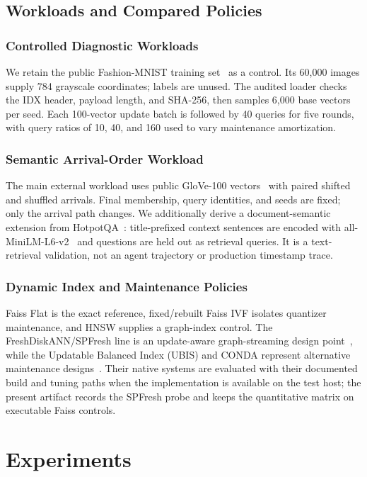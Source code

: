 \subsection{Workloads and Compared Policies}
\subsubsection{Controlled Diagnostic Workloads}
We retain the public Fashion-MNIST training set~\cite{fashion} as a control. Its 60,000
images supply 784 grayscale coordinates; labels are unused. The audited loader checks
the IDX header, payload length, and SHA-256, then samples 6,000 base vectors per seed.
Each 100-vector update batch is followed by 40 queries for five rounds, with query
ratios of 10, 40, and 160 used to vary maintenance amortization.

\subsubsection{Semantic Arrival-Order Workload}
The main external workload uses public GloVe-100 vectors~\cite{glove} with paired
shifted and shuffled arrivals. Final membership, query identities, and seeds are fixed;
only the arrival path changes. We additionally derive a document-semantic extension
from HotpotQA~\cite{hotpotqa}: title-prefixed context sentences are encoded with
all-MiniLM-L6-v2~\cite{sentencebert} and questions are held out as retrieval queries.
It is a text-retrieval validation, not an agent trajectory or production timestamp trace.

\subsubsection{Dynamic Index and Maintenance Policies}
Faiss Flat is the exact reference, fixed/rebuilt Faiss IVF isolates quantizer
maintenance, and HNSW supplies a graph-index control. The FreshDiskANN/SPFresh line is
an update-aware graph-streaming design point~\cite{spfresh}, while the Updatable Balanced
Index (UBIS) and CONDA represent alternative maintenance designs~\cite{updatable,conda}.
Their native systems are evaluated with their documented build and tuning paths when
the implementation is available on the test host; the present artifact records the
SPFresh probe and keeps the quantitative matrix on executable Faiss controls.

\section{Experiments}
